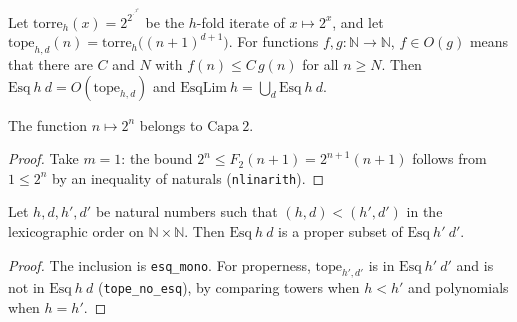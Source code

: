 \begin{definition}
  \label{def:scales-esq}
  \leanok
  Let $\mathrm{torre}_h(x) = 2^{2^{\cdot^{\cdot^{2^x}}}}$ be the $h$-fold iterate of $x \mapsto 2^x$, and
  let $\mathrm{tope}_{h,d}(n) = \mathrm{torre}_h\big((n+1)^{d+1}\big)$. For functions $f, g :
  \mathbb{N}\to\mathbb{N}$, $f \in O(g)$ means that there are $C$ and $N$ with $f(n) \le C\,g(n)$ for all
  $n \ge N$. Then $\mathrm{Esq}\ h\ d = O(\mathrm{tope}_{h,d})$ and $\mathrm{EsqLim}\ h = \bigcup_d
  \mathrm{Esq}\ h\ d$.
  \own{}
\end{definition}

\begin{theorem}
  \label{thm:scales-dos-pow-capa-dos}
  \leanok
  The function $n \mapsto 2^n$ belongs to $\mathrm{Capa}\ 2$.
  \own{}
\end{theorem}

\begin{proof}
  \leanok
  Take $m = 1$: the bound $2^n \le F_2(n+1) = 2^{n+1}(n+1)$ follows from $1 \le 2^n$ by an inequality
  of naturals (\texttt{nlinarith}).
\end{proof}

\begin{theorem}
  \label{thm:scales-esq-estricta}
  \leanok
  Let $h, d, h', d'$ be natural numbers such that $(h,d) < (h',d')$ in the lexicographic order on
  $\mathbb{N}\times\mathbb{N}$. Then $\mathrm{Esq}\ h\ d$ is a proper subset of $\mathrm{Esq}\ h'\ d'$.
  \own{}
\end{theorem}

\begin{proof}
  \leanok
  The inclusion is \texttt{esq\_mono}. For properness, $\mathrm{tope}_{h',d'}$ is in $\mathrm{Esq}\ h'\
  d'$ and is not in $\mathrm{Esq}\ h\ d$ (\texttt{tope\_no\_esq}), by comparing towers when $h < h'$ and
  polynomials when $h = h'$.
\end{proof}

